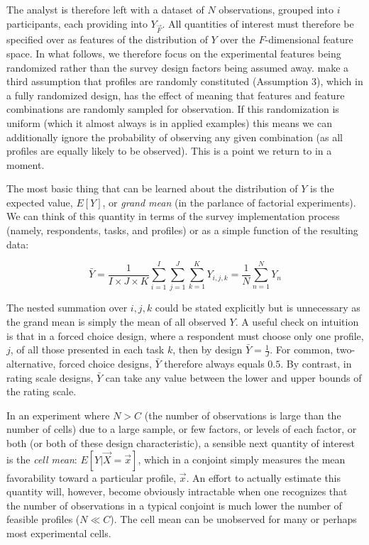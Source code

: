 \documentclass[a4paper,12pt]{article}\usepackage[]{graphicx}\usepackage[]{color}
\begin{document}
The analyst is therefore left with a dataset of $N$ observations, grouped into $i$ participants, each providing into $Y_{\vec{F}}$. All quantities of interest must therefore be specified over as features of the distribution of $Y$ over the $F$-dimensional feature space. In what follows, we therefore focus on the experimental features being randomized rather than the survey design factors being assumed away. \citet{HainmuellerHopkinsYamamoto2014} make a third assumption that profiles are randomly constituted (Assumption 3), which in a fully randomized design, has the effect of meaning that features and feature combinations are randomly sampled for observation. If this randomization is uniform (which it almost always is in applied examples) this means we can additionally ignore the probability of observing any given combination (as all profiles are equally likely to be observed). This is a point we return to in a moment.

The most basic thing that can be learned about the distribution of $Y$ is the expected value, $E[Y]$, or \textit{grand mean} (in the parlance of factorial experiments). We can think of this quantity in terms of the survey implementation process (namely, respondents, tasks, and profiles) or as a simple function of the resulting data:

\begin{equation}
\bar{Y} = \dfrac{1}{I \times J \times K} \sum_{i=1}^{I} \sum_{j=1}^{J} \sum_{k=1}^{K} Y_{i,j,k} = \dfrac{1}{N} \sum_{n=1}^{N} Y_n
\end{equation}

\noindent The nested summation over $i,j,k$ could be stated explicitly but is unnecessary as the grand mean is simply the mean of all observed $Y$. A useful check on intuition is that in a forced choice design, where a respondent must choose only one profile, $j$, of all those presented in each task $k$, then by design $\bar{Y} = \frac{1}{J}$. For common, two-alternative, forced choice designs, $\bar{Y}$ therefore always equals $0.5$. By contrast, in rating scale designs, $\bar{Y}$ can take any value between the lower and upper bounds of the rating scale.

In an experiment where $N > C$ (the number of observations is large than the number of cells) due to a large sample, or few factors, or levels of each factor, or both (or both of these design characteristic), a sensible next quantity of interest is the \textit{cell mean}: $E[Y|\vec{X} = \vec{x}]$, which in a conjoint simply measures the mean favorability toward a particular profile, $\vec{x}$. An effort to actually estimate this quantity will, however, become obviously intractable when one recognizes that the number of observations in a typical conjoint is much lower the number of feasible profiles ($N \ll C$). The cell mean can be unobserved for many or perhaps most experimental cells. 
\end{document}

